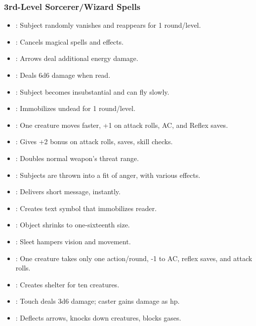 \subsubsection{3rd-Level Sorcerer/Wizard Spells}
\begin{itemize}
\item {}: Subject randomly vanishes and reappears for 1 round/level.
\item {}: Cancels magical spells and effects.
\item {}: Arrows deal additional energy damage.
\item {}: Deals 6d6 damage when read.
\item {}: Subject becomes insubstantial and can fly slowly.
\item {}: Immobilizes undead for 1 round/level.
\item {}: One creature moves faster, +1 on attack rolls, AC, and Reflex saves.
\item {}: Gives +2 bonus on attack rolls, saves, skill checks.
\item {}: Doubles normal weapon's threat range.
\item {}: Subjects are thrown into a fit of anger, with various effects.
\item {}: Delivers short message, instantly.
\item {}: Creates text symbol that immobilizes reader.
\item {}: Object shrinks to one-sixteenth size.
\item {}: Sleet hampers vision and movement.
\item {}: One creature takes only one action/round, -1 to AC, reflex saves, and attack rolls.
\item {}: Creates shelter for ten creatures.
\item {}: Touch deals 3d6 damage; caster gains damage as hp.
\item {}: Deflects arrows, knocks down creatures, blocks gases.
\end{itemize}
